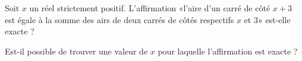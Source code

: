 
\begin{exercice}\label{exosmath-0561}

Soit \( x\) un réel strictement positif. L'affirmation «l'aire d'un carré de côté \( x+3\) est égale à la somme des airs de deux carrés de côtés respectifs \( x\) et 3» est-elle exacte ?

Est-il possible de trouver une valeur de \( x\) pour laquelle l'affirmation est exacte ?

\end{exercice}
